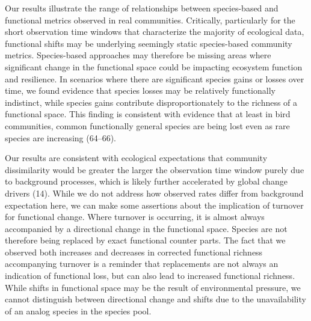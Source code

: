\documentclass{article}
\begin{document}
Our results illustrate the range of relationships between species-based
and functional metrics observed in real communities. Critically,
particularly for the short observation time windows that characterize
the majority of ecological data, functional shifts may be underlying
seemingly static species-based community metrics. Species-based
approaches may therefore be missing areas where significant change in
the functional space could be impacting ecosystem function and
resilience. In scenarios where there are significant species gains or
losses over time, we found evidence that species losses may be
relatively functionally indistinct, while species gains contribute
disproportionately to the richness of a functional space. This finding
is consistent with evidence that at least in bird communities, common
functionally general species are being lost even as rare species are
increasing (64--66).

Our results are consistent with ecological expectations that community
dissimilarity would be greater the larger the observation time window
purely due to background processes, which is likely further accelerated
by global change drivers (14). While we do not address how observed
rates differ from background expectation here, we can make some
assertions about the implication of turnover for functional change.
Where turnover is occurring, it is almost always accompanied by a
directional change in the functional space. Species are not therefore
being replaced by exact functional counter parts. The fact that we
observed both increases and decreases in corrected functional richness
accompanying turnover is a reminder that replacements are not always an
indication of functional loss, but can also lead to increased functional
richness. While shifts in functional space may be the result of
environmental pressure, we cannot distinguish between directional change
and shifts due to the unavailability of an analog species in the species
pool.
\end{document}
